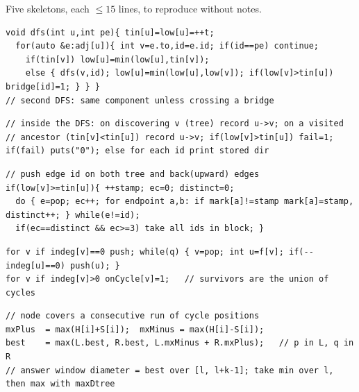 
Five skeletons, each \(\le15\) lines, to reproduce without notes.

\begin{lstlisting}[caption={Drill 1 -- low-link bridges and contraction in one pass. Skip the parent edge id, bridge iff low child strictly above tin parent}, label={lst:c31-d1}]
void dfs(int u,int pe){ tin[u]=low[u]=++t;
  for(auto &e:adj[u]){ int v=e.to,id=e.id; if(id==pe) continue;
    if(tin[v]) low[u]=min(low[u],tin[v]);
    else { dfs(v,id); low[u]=min(low[u],low[v]); if(low[v]>tin[u]) bridge[id]=1; } } }
// second DFS: same component unless crossing a bridge
\end{lstlisting}

\begin{lstlisting}[caption={Drill 2 -- CF 118E orientation: tree edge down, back edge up to the ancestor, print 0 on any bridge}, label={lst:c31-d2}]
// inside the DFS: on discovering v (tree) record u->v; on a visited
// ancestor (tin[v]<tin[u]) record u->v; if(low[v]>tin[u]) fail=1;
if(fail) puts("0"); else for each id print stored dir
\end{lstlisting}

\begin{lstlisting}[caption={Drill 3 -- block pop and the lone-cycle test}, label={lst:c31-d3}]
// push edge id on both tree and back(upward) edges
if(low[v]>=tin[u]){ ++stamp; ec=0; distinct=0;
  do { e=pop; ec++; for endpoint a,b: if mark[a]!=stamp mark[a]=stamp, distinct++; } while(e!=id);
  if(ec==distinct && ec>=3) take all ids in block; }
\end{lstlisting}

\begin{lstlisting}[caption={Drill 4 -- functional peel leaving exactly the cycle vertices}, label={lst:c31-d4}]
for v if indeg[v]==0 push; while(q) { v=pop; int u=f[v]; if(--indeg[u]==0) push(u); }
for v if indeg[v]>0 onCycle[v]=1;   // survivors are the union of cycles
\end{lstlisting}

\begin{lstlisting}[caption={Drill 5 -- the Summit's window monoid merge}, label={lst:c31-d5}]
// node covers a consecutive run of cycle positions
mxPlus  = max(H[i]+S[i]);  mxMinus = max(H[i]-S[i]);
best    = max(L.best, R.best, L.mxMinus + R.mxPlus);   // p in L, q in R
// answer window diameter = best over [l, l+k-1]; take min over l, then max with maxDtree
\end{lstlisting}

